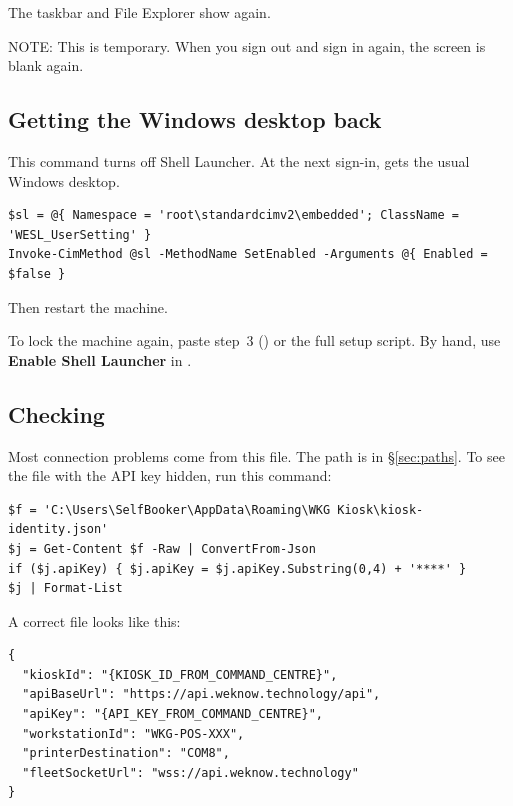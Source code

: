 \documentclass[a4paper,10pt]{article}
\begin{document}
\noindent The taskbar and File Explorer show again.

\noindent NOTE: This is temporary. When you sign out and sign in again, the screen
is blank again.

\subsection{Getting the Windows desktop back}\label{sec:unlock}

This command turns off Shell Launcher. At the next sign-in,
 gets the usual Windows desktop.

\begin{lstlisting}
$sl = @{ Namespace = 'root\standardcimv2\embedded'; ClassName = 'WESL_UserSetting' }
Invoke-CimMethod @sl -MethodName SetEnabled -Arguments @{ Enabled = $false }
\end{lstlisting}

\noindent Then restart the machine.

\noindent To lock the machine again, paste step~3 () or the
full setup script. By hand, use \textbf{Enable Shell Launcher} in
.

\subsection{Checking }\label{sec:identity}

Most connection problems come from this file. The path is in
\S\ref{sec:paths}. To see the file with the API key hidden, run this
command:

\begin{lstlisting}
$f = 'C:\Users\SelfBooker\AppData\Roaming\WKG Kiosk\kiosk-identity.json'
$j = Get-Content $f -Raw | ConvertFrom-Json
if ($j.apiKey) { $j.apiKey = $j.apiKey.Substring(0,4) + '****' }
$j | Format-List
\end{lstlisting}

A correct file looks like this:

\begin{lstlisting}
{
  "kioskId": "{KIOSK_ID_FROM_COMMAND_CENTRE}",
  "apiBaseUrl": "https://api.weknow.technology/api",
  "apiKey": "{API_KEY_FROM_COMMAND_CENTRE}",
  "workstationId": "WKG-POS-XXX",
  "printerDestination": "COM8",
  "fleetSocketUrl": "wss://api.weknow.technology"
}
\end{lstlisting}
\end{document}

